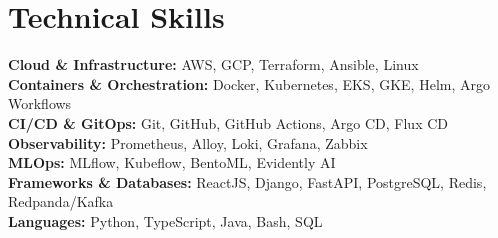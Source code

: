 \documentclass[letterpaper,11pt]{article}
\begin{document}
\section{Technical Skills}
\begin{itemize}[leftmargin=0.15in, label={}]
  \small{\item{
    \textbf{Cloud \& Infrastructure:} AWS, GCP, Terraform, Ansible, Linux \\
    \textbf{Containers \& Orchestration:} Docker, Kubernetes, EKS, GKE, Helm, Argo Workflows \\
    \textbf{CI/CD \& GitOps:} Git, GitHub, GitHub Actions, Argo CD, Flux CD \\
    \textbf{Observability:} Prometheus, Alloy, Loki, Grafana, Zabbix \\
    \textbf{MLOps:} MLflow, Kubeflow, BentoML, Evidently AI \\
    \textbf{Frameworks \& Databases:} ReactJS, Django, FastAPI, PostgreSQL, Redis, Redpanda/Kafka \\
    \textbf{Languages:} Python, TypeScript, Java, Bash, SQL
  }}
\end{itemize}
\end{document}

